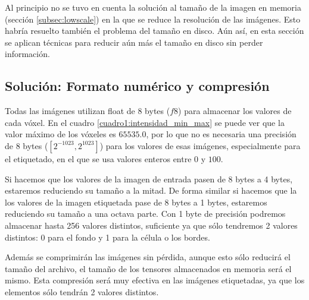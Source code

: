 Al principio no se tuvo en cuenta la solución al tamaño de la imagen en memoria (sección \ref{subsec:lowscale}) en la que se reduce la resolución de las imágenes. Esto habría resuelto también el problema del tamaño en disco. Aún así, en esta sección se aplican técnicas para reducir aún más el tamaño en disco sin perder información.

\subsection{Solución: Formato numérico y compresión}\label{subsec:disk_formato}

Todas las imágenes utilizan float de 8 bytes ($f8$) para almacenar los valores de cada vóxel. En el cuadro \ref{cuadro1:intensidad_min_max} se puede ver que la valor máximo de los vóxeles es $65535.0$, por lo que no es necesaria una precisión de 8 bytes ($[2^{-1023}, 2^{1023}]$) para los valores de esas imágenes, especialmente para el etiquetado, en el que se usa valores enteros entre $0$ y $100$.


Si hacemos que los valores de la imagen de entrada pasen de 8 bytes a 4 bytes, estaremos reduciendo su tamaño a la mitad. De forma similar si hacemos que la los valores de la imagen etiquetada pase de 8 bytes a 1 bytes, estaremos reduciendo su tamaño a una octava parte. Con 1 byte de precisión podremos almacenar hasta 256 valores distintos, suficiente ya que sólo tendremos 2 valores distintos: 0 para el fondo y 1 para la célula o los bordes. 

Además se comprimirán las imágenes sin pérdida, aunque esto sólo reducirá el tamaño del archivo, el tamaño de los tensores almacenados en memoria será el mismo. Esta compresión será muy efectiva en las imágenes etiquetadas, ya que los elementos sólo tendrán 2 valores distintos. 

